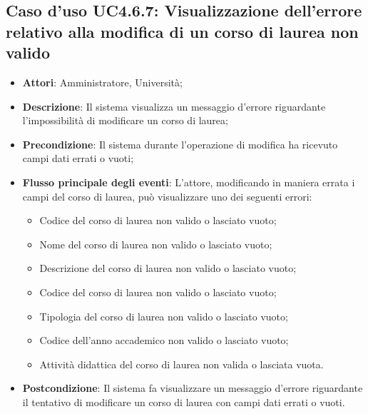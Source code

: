 \subsection{Caso d'uso \texorpdfstring{UC4.6.7}{UC4.6.7}: Visualizzazione dell'errore relativo alla modifica di un corso di laurea non valido}
\begin{itemize}
	\item \textbf{Attori}: Amministratore, Università;
	\item \textbf{Descrizione}: Il sistema visualizza un messaggio d'errore riguardante l'impossibilità di modificare un corso di laurea;
	
	\item \textbf{Precondizione}: Il sistema durante l'operazione di modifica ha ricevuto campi dati errati o vuoti;
	
	\item \textbf{Flusso principale degli eventi}: L'attore, modificando in maniera errata i campi del corso di laurea, può visualizzare uno dei seguenti errori: \begin{itemize} 
		\item Codice del corso di laurea non valido o lasciato vuoto; 
		\item Nome del corso di laurea non valido o lasciato vuoto; 
		\item Descrizione del corso di laurea non valido o lasciato vuoto; 
		\item Codice del corso di laurea non valido o lasciato vuoto; 
		\item Tipologia del corso di laurea non valido o lasciato vuoto; 
		\item Codice dell'anno accademico non valido o lasciato vuoto; 
		\item Attività didattica del corso di laurea non valida o lasciata vuota.
	\end{itemize}
	\item \textbf{Postcondizione}: Il sistema fa visualizzare un messaggio d'errore riguardante il tentativo di modificare un corso di laurea con campi dati errati o vuoti.
	
\end{itemize}
